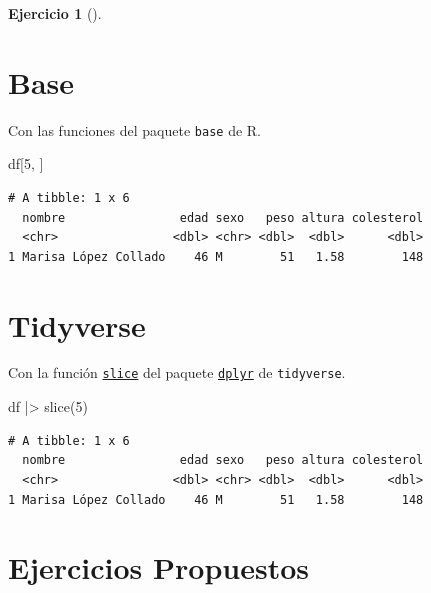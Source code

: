 \documentclass[
  a4paper,
]{scrreport}
\newenvironment{Shaded}{\begin{snugshade}}{\end{snugshade}}
\newcommand{\DecValTok}[1]{\textcolor[rgb]{0.68,0.00,0.00}{#1}}
\newcommand{\FunctionTok}[1]{\textcolor[rgb]{0.28,0.35,0.67}{#1}}
\newcommand{\NormalTok}[1]{\textcolor[rgb]{0.00,0.23,0.31}{#1}}
\newcommand{\SpecialCharTok}[1]{\textcolor[rgb]{0.37,0.37,0.37}{#1}}
\theoremstyle{definition}
\newtheorem{exercise}{Ejercicio}[chapter]
\theoremstyle{remark}
\begin{document}
\begin{exercise}[]
\begin{enumerate}
\begin{tcolorbox}
  \section{Base}

  Con las funciones del paquete \texttt{base} de R.

\begin{Shaded}
\begin{Highlighting}[]
\NormalTok{df[}\DecValTok{5}\NormalTok{, ]}
\end{Highlighting}
\end{Shaded}

\begin{verbatim}
# A tibble: 1 x 6
  nombre                edad sexo   peso altura colesterol
  <chr>                <dbl> <chr> <dbl>  <dbl>      <dbl>
1 Marisa López Collado    46 M        51   1.58        148
\end{verbatim}

  \section{Tidyverse}

  Con la función
  \href{https://dplyr.tidyverse.org/reference/slice.html}{\texttt{slice}}
  del paquete
  \href{https://dplyr.tidyverse.org/index.html}{\texttt{dplyr}} de
  \texttt{tidyverse}.

\begin{Shaded}
\begin{Highlighting}[]
\NormalTok{df }\SpecialCharTok{|\textgreater{}} \FunctionTok{slice}\NormalTok{(}\DecValTok{5}\NormalTok{)}
\end{Highlighting}
\end{Shaded}

\begin{verbatim}
# A tibble: 1 x 6
  nombre                edad sexo   peso altura colesterol
  <chr>                <dbl> <chr> <dbl>  <dbl>      <dbl>
1 Marisa López Collado    46 M        51   1.58        148
\end{verbatim}

  \end{tcolorbox}
\end{enumerate}

\end{exercise}

\section{Ejercicios Propuestos}\label{ejercicios-propuestos}
\end{document}
